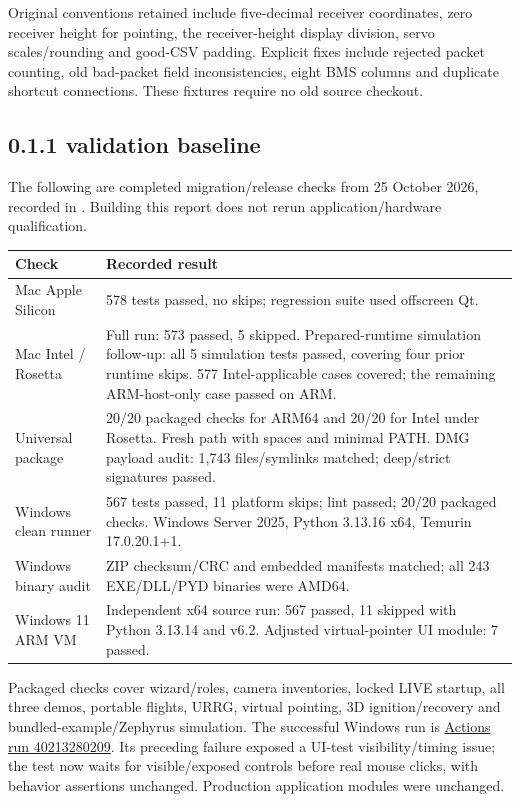 Original conventions retained include five-decimal receiver coordinates,
zero receiver height for pointing, the receiver-height display division,
servo scales/rounding and good-CSV padding. Explicit fixes include rejected
packet counting, old bad-packet field inconsistencies, eight BMS columns and
duplicate shortcut connections. These fixtures require no old source checkout.

\subsection{0.1.1 validation baseline}
The following are completed migration/release checks from 25 October 2026,
recorded in . Building this report does not
rerun application/hardware qualification.
\begin{longtable}{@{}L{.30\linewidth}L{.63\linewidth}@{}}
\toprule Check & Recorded result \\\midrule\endhead
Mac Apple Silicon & 578 tests passed, no skips; regression suite used offscreen Qt. \\
Mac Intel / Rosetta & Full run: 573 passed, 5 skipped. Prepared-runtime simulation follow-up: all 5 simulation tests passed, covering four prior runtime skips. 577 Intel-applicable cases covered; the remaining ARM-host-only case passed on ARM. \\
Universal package & 20/20 packaged checks for ARM64 and 20/20 for Intel under Rosetta. Fresh path with spaces and minimal PATH. DMG payload audit: 1,743 files/symlinks matched; deep/strict signatures passed. \\
Windows clean runner & 567 tests passed, 11 platform skips; lint passed; 20/20 packaged checks. Windows Server 2025, Python 3.13.16 x64, Temurin 17.0.20.1+1. \\
Windows binary audit & ZIP checksum/CRC and embedded manifests matched; all 243 EXE/DLL/PYD binaries were AMD64. \\
Windows 11 ARM VM & Independent x64 source run: 567 passed, 11 skipped with Python 3.13.14 and v6.2. Adjusted virtual-pointer UI module: 7 passed. \\
\bottomrule
\end{longtable}
Packaged checks cover wizard/roles, camera inventories, locked LIVE startup,
all three demos, portable flights, URRG, virtual pointing, 3D ignition/recovery
and bundled-example/Zephyrus simulation. The successful Windows run is
\href{https://github.com/MIT-Rocket-Team/RT_Telemetry_UI/actions/runs/40213280209}{Actions run 40213280209}.
Its preceding failure exposed a UI-test visibility/timing issue; the test now
waits for visible/exposed controls before real mouse clicks, with behavior
assertions unchanged. Production application modules were unchanged.

